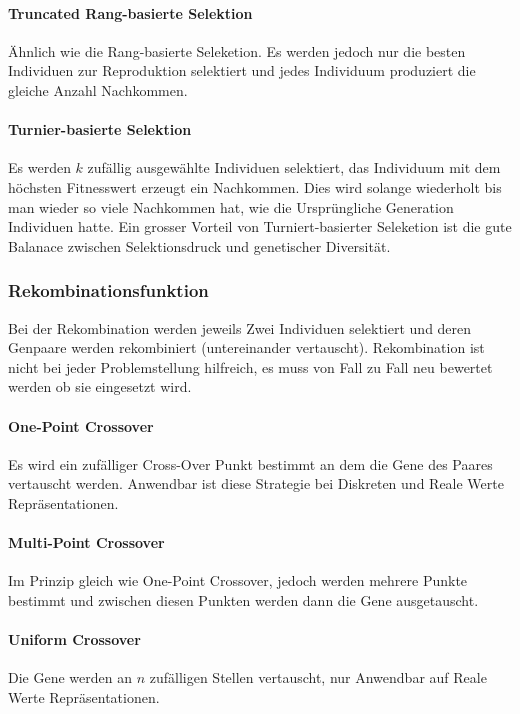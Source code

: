       \paragraph{Truncated Rang-basierte Selektion}
        Ähnlich wie die Rang-basierte Seleketion. Es werden jedoch nur die besten Individuen zur Reproduktion selektiert und
        jedes Individuum produziert die gleiche Anzahl Nachkommen.

      \paragraph{Turnier-basierte Selektion\label{par:Turnier}}

        Es werden \(k\) zufällig ausgewählte Individuen selektiert, das Individuum mit dem höchsten Fitnesswert erzeugt ein Nachkommen. Dies wird solange wiederholt bis man wieder so viele Nachkommen hat,
        wie die Ursprüngliche Generation Individuen hatte. Ein grosser Vorteil von Turniert-basierter Seleketion ist die gute Balanace zwischen Selektionsdruck und genetischer Diversität.

    \subsubsection{Rekombinationsfunktion}
        Bei der Rekombination werden jeweils Zwei Individuen selektiert und deren Genpaare werden rekombiniert (untereinander vertauscht).
        Rekombination ist nicht bei jeder Problemstellung hilfreich, es muss von Fall zu Fall neu bewertet werden ob sie eingesetzt wird.

        \paragraph{One-Point Crossover}
          Es wird ein zufälliger Cross-Over Punkt bestimmt an dem die Gene des Paares vertauscht werden.
          Anwendbar ist diese Strategie bei Diskreten und Reale Werte Repräsentationen.

        \paragraph{Multi-Point Crossover}
          Im Prinzip gleich wie One-Point Crossover, jedoch werden mehrere Punkte bestimmt und
          zwischen diesen Punkten werden dann die Gene ausgetauscht.

        \paragraph{Uniform Crossover}
          Die Gene werden an \(n\) zufälligen Stellen vertauscht, nur Anwendbar auf Reale Werte Repräsentationen.

